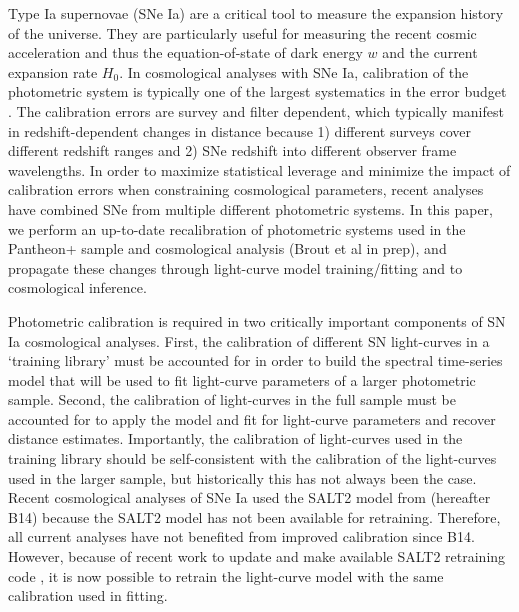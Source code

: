 \documentclass[twocolumn]{aastex63}
\newcommand{\blue}{\color{black}}
\begin{document}
Type Ia supernovae (SNe Ia) are a critical tool to measure the expansion history of the universe.  They are particularly useful for measuring the recent cosmic acceleration and thus the equation-of-state of dark energy $w$ and the current expansion rate $H_0$.  In cosmological analyses with SNe Ia, calibration of the photometric system is typically one of the largest systematics in the error budget \citep{Betoule2014,Scolnic18,Jones19}.  The calibration errors are survey and filter dependent, which typically manifest in redshift-dependent changes in distance because 1) different surveys cover different redshift ranges and 2) SNe redshift into different observer frame wavelengths. In order to maximize statistical leverage and minimize the impact of calibration errors when constraining cosmological parameters, recent analyses have combined SNe from multiple different photometric systems.  In this paper, we perform an up-to-date recalibration of photometric systems used in the Pantheon+ sample \citep{scolnic22} and cosmological analysis (Brout et al in prep), and propagate these changes through light-curve model training/fitting and to cosmological inference.

Photometric calibration is required in two critically important components of SN Ia cosmological analyses. {\blue First, the calibration of different SN light-curves in a `training library’ must be accounted for in order to build the spectral time-series model that will be used to fit light-curve parameters of a larger photometric sample.  Second, the calibration of light-curves in the full sample must be accounted for to apply the model and fit for light-curve parameters and recover distance estimates. Importantly, the calibration of light-curves used in the training library should be self-consistent with the calibration of the light-curves used in the larger sample, but historically this has not always been the case.  Recent cosmological analyses \citep{Scolnic18,Brout18b} of SNe Ia used the SALT2 model from \cite{Betoule2014} (hereafter B14) because the SALT2 model has not been available for retraining.  Therefore, all current analyses have not benefited from improved calibration since B14.  However, because of recent work to update and make available SALT2 retraining code \citep{Taylor21,Kenworthy21}, it is now possible to retrain the light-curve model with the same calibration used in fitting.}
\end{document}
